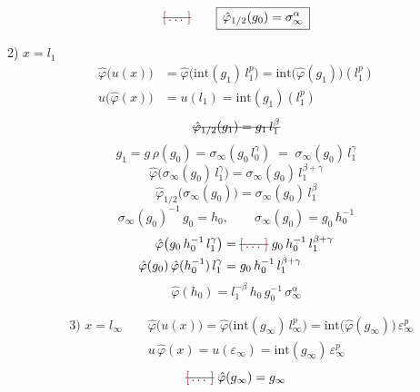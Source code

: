 \documentclass[11pt,a4paper]{article}
\begin{document}

\[
\text{\struck{\ill{}}}\qquad
\boxed{\,\hat{\varphi}_{1/2}(g_0) = \sigma_\infty^{\alpha}\,}
\]

2) $x = l_1$
\[
\begin{aligned}
\hat{\varphi}\bigl(u(x)\bigr) &= \hat{\varphi}\bigl(\mathrm{int}(g_1)\, l_1^{p}\bigr) = \mathrm{int}\bigl(\hat{\varphi}(g_1)\bigr)(l_1^{p}) \\
u\bigl(\hat{\varphi}(x)\bigr) &= u(l_1) = \mathrm{int}(g_1)(l_1^{p})
\end{aligned}
\]
\[
\text{\struck{$\hat{\varphi}_{1/2}(g_1) = g_1\, l_1^{\beta}$}}
\]
\[
g_1 = g\,\rho(g_0) = \sigma_\infty(g_0\, l_0^{\gamma}) \;=\; \sigma_\infty(g_0)\, l_1^{\gamma}
\]
\[
\hat{\varphi}\bigl(\sigma_\infty(g_0)\, l_1^{\gamma}\bigr) = \sigma_\infty(g_0)\, l_1^{\beta+\gamma}
\]
\[
\boxed{\,\hat{\varphi}_{1/2}\bigl(\sigma_\infty(g_0)\bigr) = \sigma_\infty(g_0)\, l_1^{\beta}\,}
\]
\[
\sigma_\infty(g_0)^{-1}\, g_0 = h_0, \qquad \sigma_\infty(g_0) = g_0\, h_0^{-1}
\]
\[
\begin{aligned}
\hat{\varphi}\bigl(g_0\, h_0^{-1}\, l_1^{\gamma}\bigr) &= \text{\struck{\ill{}}}\; g_0\, h_0^{-1}\, l_1^{\beta+\gamma} \\
\hat{\varphi}(g_0)\, \hat{\varphi}(h_0^{-1})\, l_1^{\gamma} &= g_0\, h_0^{-1}\, l_1^{\beta+\gamma}
\end{aligned}
\]
\[
\hat{\varphi}(h_0) = l_1^{-\beta}\, h_0\, g_0^{-1}\, \sigma_\infty^{\alpha}
\]

\[
\begin{aligned}
&\text{3) } x = l_\infty \qquad
\hat{\varphi}\bigl(u(x)\bigr) = \hat{\varphi}\bigl(\mathrm{int}(g_\infty)\, l_\infty^{p}\bigr) = \mathrm{int}\bigl(\hat{\varphi}(g_\infty)\bigr)\, \varepsilon_\infty^{p} \\
&\phantom{\text{3) } x = l_\infty \qquad} u\,\hat{\varphi}(x) = u(\varepsilon_\infty) = \mathrm{int}(g_\infty)\, \varepsilon_\infty^{p}
\end{aligned}
\]
\[
\text{\struck{\ill{}}}\;\hat{\varphi}(g_\infty) = g_\infty
\]
\end{document}
